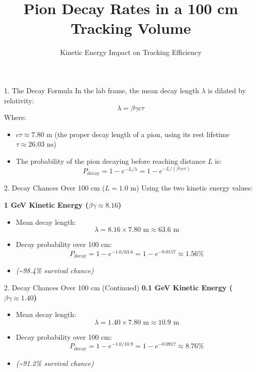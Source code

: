 \documentclass[aspectratio=169]{beamer}
\title{Pion Decay Rates in a 100 cm Tracking Volume}
\subtitle{Kinetic Energy Impact on Tracking Efficiency}
\author{}
\date{}
\begin{document}
\begin{frame}
    \titlepage
\end{frame}

\begin{frame}{1. The Decay Formula}
    In the lab frame, the mean decay length $\lambda$ is dilated by relativity:
    \[ \lambda = \beta\gamma c\tau \]
    Where:
    \begin{itemize}
        \item $c\tau \approx 7.80 \text{ m}$ (the proper decay length of a pion, using its rest lifetime $\tau \approx 26.03 \text{ ns}$)
        \item The probability of the pion decaying before reaching distance $L$ is:
        \[ P_{\text{decay}} = 1 - e^{-L/\lambda} = 1 - e^{-L/(\beta\gamma c\tau)} \]
    \end{itemize}
\end{frame}

\begin{frame}{2. Decay Chances Over 100 cm ($L = 1.0 \text{ m}$)}
    Using the two kinetic energy values:
    \vspace{0.5em}
    
    \textbf{1 GeV Kinetic Energy ($\beta\gamma \approx 8.16$)}
    \begin{itemize}
        \item Mean decay length: 
        \[ \lambda = 8.16 \times 7.80 \text{ m} \approx 63.6 \text{ m} \]
        \item Decay probability over 100 cm: 
        \[ P_{\text{decay}} = 1 - e^{-1.0/63.6} = 1 - e^{-0.0157} \approx 1.56\% \]
        \item \textit{(\textasciitilde 98.4\% survival chance)}
    \end{itemize}
\end{frame}

\begin{frame}{2. Decay Chances Over 100 cm (Continued)}
    \textbf{0.1 GeV Kinetic Energy ($\beta\gamma \approx 1.40$)}
    \begin{itemize}
        \item Mean decay length: 
        \[ \lambda = 1.40 \times 7.80 \text{ m} \approx 10.9 \text{ m} \]
        \item Decay probability over 100 cm: 
        \[ P_{\text{decay}} = 1 - e^{-1.0/10.9} = 1 - e^{-0.0917} \approx 8.76\% \]
        \item \textit{(\textasciitilde 91.2\% survival chance)}
    \end{itemize}
\end{frame}
\end{document}
